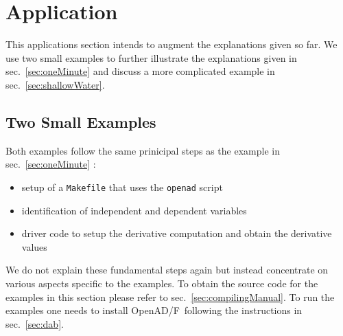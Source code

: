 \documentclass{book}
\newcommand{\OpenADF}{OpenAD/F}
\newcommand{\refsec}[1]{{sec.~\ref{#1}}}
\begin{document}
\chapter{Application}\label{sec:application}
This applications section intends to augment the explanations given so far. 
We use two small examples to further illustrate the  explanations given in \refsec{sec:oneMinute} and 
discuss a more complicated example in \refsec{sec:shallowWater}. 
\section{Two Small Examples}\label{sec:toyExample}
Both examples follow the same prinicipal steps as the example in \refsec{sec:oneMinute} :
\begin{itemize}
\item setup of a \lstinline{Makefile} that uses the \lstinline{openad} script
\item identification of independent and dependent variables
\item driver code to setup the derivative computation and obtain the derivative values
\end{itemize}
We do not explain these fundamental steps again but instead concentrate on various aspects 
specific to the examples. 
To obtain the source code for the examples in this section please refer to \refsec{sec:compilingManual}. 
To run the examples one needs to install \OpenADF\ following the instructions in \refsec{sec:dab}.
\end{document}
